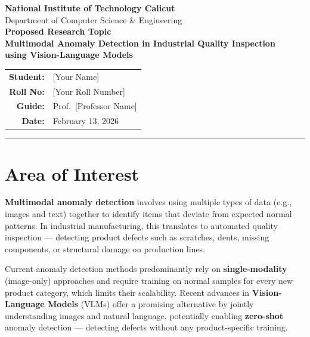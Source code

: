 \documentclass[12pt, a4paper]{article}
\begin{document}
\begin{center}
    {\large \textbf{National Institute of Technology Calicut}}\\[0.2cm]
    {\normalsize Department of Computer Science \& Engineering}\\[0.8cm]
    
    {\Large \textbf{Proposed Research Topic}}\\[0.4cm]
    
    {\large \textbf{Multimodal Anomaly Detection in Industrial Quality Inspection\\ using Vision-Language Models}}\\[0.8cm]
    
    \begin{tabular}{rl}
        \textbf{Student:} & [Your Name] \\
        \textbf{Roll No:} & [Your Roll Number] \\
        \textbf{Guide:} & Prof.\ [Professor Name] \\
        \textbf{Date:} & February 13, 2026 \\
    \end{tabular}
\end{center}

\vspace{0.5cm}
\hrule
\vspace{0.5cm}

\section{Area of Interest}

\textbf{Multimodal anomaly detection} involves using multiple types of data (e.g., images and text) together to identify items that deviate from expected normal patterns. In industrial manufacturing, this translates to automated quality inspection --- detecting product defects such as scratches, dents, missing components, or structural damage on production lines.

Current anomaly detection methods predominantly rely on \textbf{single-modality} (image-only) approaches and require training on normal samples for every new product category, which limits their scalability. Recent advances in \textbf{Vision-Language Models} (VLMs) offer a promising alternative by jointly understanding images and natural language, potentially enabling \textbf{zero-shot} anomaly detection --- detecting defects without any product-specific training.
\end{document}
